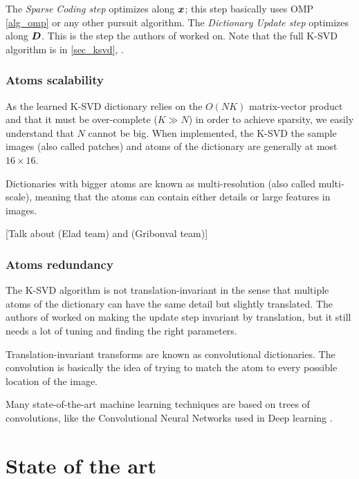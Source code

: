 The \emph{Sparse Coding step} optimizes along $\bm{x}$; this step basically uses OMP \cref{alg_omp} or any other pursuit algorithm. The \emph{Dictionary Update step} optimizes along $\bm{D}$. This is the step the authors of \cite{chabiron_optimization_2016} worked on. Note that the full K-SVD algorithm is in \cref{sec_ksvd}, .




\subsection{Atoms scalability}
As the learned K-SVD dictionary relies on the $O(NK)$ matrix-vector product and that it must be over-complete ($K \gg N$) in order to achieve sparsity, we easily understand that $N$ cannot be big. When implemented, the K-SVD the sample images (also called patches) and atoms of the dictionary are generally at most $16 \times 16$. 

Dictionaries with bigger atoms are known as multi-resolution (also called multi-scale), meaning that the atoms can contain either details or large features in images.

[Talk about \cite{magoarou_learning_2015} (Elad team) and \cite{sulam_trainlets:_2016} (Gribonval team)]

\subsection{Atoms redundancy} \label{sec_atoms_redund}
The K-SVD algorithm is not translation-invariant in the sense that multiple atoms of the dictionary can have the same detail but slightly translated. The authors of \cite{mailhe_shift-invariant_2008} worked on making the update step invariant by translation, but it still needs a lot of tuning and finding the right parameters. 

Translation-invariant transforms are known as convolutional dictionaries. The convolution is basically the idea of trying to match the atom to every possible location of the image.

Many state-of-the-art machine learning techniques are based on trees of convolutions, like the Convolutional Neural Networks used in Deep learning \cite{lecun_deep_2015}.


\chapter{State of the art}

